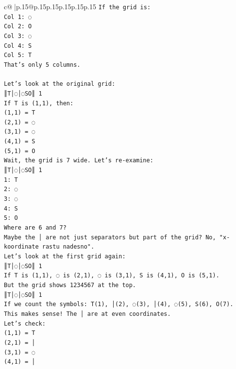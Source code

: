 \documentclass{article}
\begin{document}
{\begin{supertabular}{c@{$\;$}|p{.15\linewidth}@{}p{.15\linewidth}p{.15\linewidth}p{.15\linewidth}p{.15\linewidth}p{.15\linewidth}}
{{{\texttt{If the grid is:} \\
\texttt{Col 1: ◌} \\
\texttt{Col 2: O} \\
\texttt{Col 3: ◌} \\
\texttt{Col 4: S} \\
\texttt{Col 5: T} \\
\texttt{That's only 5 columns.} \\
\\ 
\texttt{Let's look at the original grid:} \\
\texttt{║T│◌│◌SO║ 1} \\
\texttt{If T is (1,1), then:} \\
\texttt{(1,1) = T} \\
\texttt{(2,1) = ◌} \\
\texttt{(3,1) = ◌} \\
\texttt{(4,1) = S} \\
\texttt{(5,1) = O} \\
\texttt{Wait, the grid is 7 wide. Let's re{-}examine:} \\
\texttt{║T│◌│◌SO║ 1} \\
\texttt{1: T} \\
\texttt{2: ◌} \\
\texttt{3: ◌} \\
\texttt{4: S} \\
\texttt{5: O} \\
\texttt{Where are 6 and 7?} \\
\texttt{Maybe the │ are not just separators but part of the grid? No, "x{-}koordinate rastu nadesno".} \\
\texttt{Let's look at the first grid again:} \\
\texttt{║T│◌│◌SO║ 1} \\
\texttt{If T is (1,1), ◌ is (2,1), ◌ is (3,1), S is (4,1), O is (5,1).} \\
\texttt{But the grid shows 1234567 at the top.} \\
\texttt{║T│◌│◌SO║ 1} \\
\texttt{If we count the symbols: T(1), │(2), ◌(3), │(4), ◌(5), S(6), O(7).} \\
\texttt{This makes sense! The │ are at even coordinates.} \\
\texttt{Let's check:} \\
\texttt{(1,1) = T} \\
\texttt{(2,1) = │} \\
\texttt{(3,1) = ◌} \\
\texttt{(4,1) = │} \\
}}}
\end{supertabular}}
\end{document}

